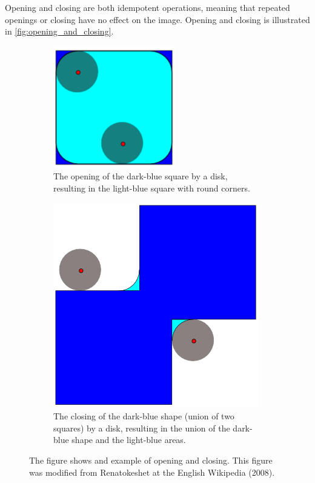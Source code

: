 Opening and closing are both idempotent operations, meaning that repeated openings or closing have no effect on the image. Opening and closing is illustrated in \autoref{fig:opening_and_closing}.
\begin{figure}[h]
  \centering
  \begin{subfigure}[t]{0.45\textwidth}
    \centering
    \includegraphics[width=0.5\linewidth]{figures/detection/opening.png}
    \caption{The opening of the dark-blue square by a disk, resulting in the light-blue square with round corners.}
    \label{fig:opening}
  \end{subfigure}
  \quad
  \begin{subfigure}[t]{0.45\textwidth}
    \centering
    \includegraphics[width=0.5\linewidth]{figures/detection/closing.png}
    \caption{The closing of the dark-blue shape (union of two squares) by a disk, resulting in the union of the dark-blue shape and the light-blue areas.}
    \label{fig:closing}
  \end{subfigure}
  \caption{The figure shows and example of opening and closing. This figure was modified from Renatokeshet at the English Wikipedia (2008).}
  \label{fig:opening_and_closing}
\end{figure}

